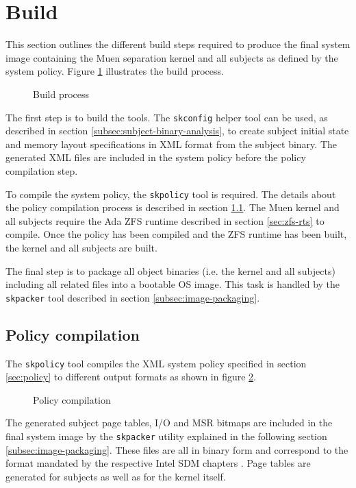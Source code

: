 \section{Build}
This section outlines the different build steps required to produce the final
system image containing the Muen separation kernel and all subjects as defined
by the system policy. Figure \ref{fig:build-process} illustrates the build
process.

\begin{figure}[h]
	\centering
	
	\caption{Build process}
	\label{fig:build-process}
\end{figure}

The first step is to build the tools. The \texttt{skconfig} helper tool can be
used, as described in section \ref{subsec:subject-binary-analysis}, to create
subject initial state and memory layout specifications in XML format from the
subject binary. The generated XML files are included in the system policy before
the policy compilation step.

To compile the system policy, the \texttt{skpolicy} tool is required. The
details about the policy compilation process is described in section
\ref{subsec:policy-compilation}.  The Muen kernel and all subjects require the
Ada ZFS runtime described in section \ref{sec:zfs-rts} to compile. Once the
policy has been compiled and the ZFS runtime has been built, the kernel and all
subjects are built.

The final step is to package all object binaries (i.e. the kernel and all
subjects) including all related files into a bootable OS image. This task is
handled by the \texttt{skpacker} tool described in section
\ref{subsec:image-packaging}.

\subsection{Policy compilation}\label{subsec:policy-compilation}
The \texttt{skpolicy} tool compiles the XML system policy specified in section
\ref{sec:policy} to different output formats as shown in figure
\ref{fig:policy-compilation}.

\begin{figure}[h]
	\centering
	
	\caption{Policy compilation}
	\label{fig:policy-compilation}
\end{figure}

The generated subject page tables, I/O and MSR bitmaps are included in the final
system image by the \texttt{skpacker} utility explained in the following section
\ref{subsec:image-packaging}. These files are all in binary form and correspond
to the format mandated by the respective Intel SDM chapters \cite{IntelSDM}.
Page tables are generated for subjects as well as for the kernel itself.

